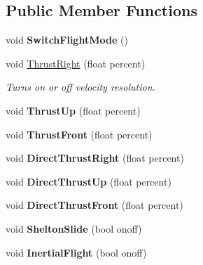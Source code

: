\subsection*{Public Member Functions}
\begin{DoxyCompactItemize}
\item 
void {\bfseries Switch\+Flight\+Mode} ()\hypertarget{classFlyByWire_af9250cf7eafb904f21574990d5c18bbb}{}\label{classFlyByWire_af9250cf7eafb904f21574990d5c18bbb}

\item 
void \hyperlink{classFlyByWire_a2eb3522f0b4c44f01d60c26e58e99970}{Thrust\+Right} (float percent)\hypertarget{classFlyByWire_a2eb3522f0b4c44f01d60c26e58e99970}{}\label{classFlyByWire_a2eb3522f0b4c44f01d60c26e58e99970}

\begin{DoxyCompactList}\small\item\em Turns on or off velocity resolution. \end{DoxyCompactList}\item 
void {\bfseries Thrust\+Up} (float percent)\hypertarget{classFlyByWire_a7f42f95122ce1140fff6c35977e398b4}{}\label{classFlyByWire_a7f42f95122ce1140fff6c35977e398b4}

\item 
void {\bfseries Thrust\+Front} (float percent)\hypertarget{classFlyByWire_a0964410d899a57570177986f729035b6}{}\label{classFlyByWire_a0964410d899a57570177986f729035b6}

\item 
void {\bfseries Direct\+Thrust\+Right} (float percent)\hypertarget{classFlyByWire_acc553e7ce408bf5ca1d333d232f8830f}{}\label{classFlyByWire_acc553e7ce408bf5ca1d333d232f8830f}

\item 
void {\bfseries Direct\+Thrust\+Up} (float percent)\hypertarget{classFlyByWire_af7155f932bb00a0967edaf8cd2d5f709}{}\label{classFlyByWire_af7155f932bb00a0967edaf8cd2d5f709}

\item 
void {\bfseries Direct\+Thrust\+Front} (float percent)\hypertarget{classFlyByWire_a80d37467a1489e74fe30764c2f5d4079}{}\label{classFlyByWire_a80d37467a1489e74fe30764c2f5d4079}

\item 
void {\bfseries Shelton\+Slide} (bool onoff)\hypertarget{classFlyByWire_a4534776da46c3f1cdb186e4a1c53a370}{}\label{classFlyByWire_a4534776da46c3f1cdb186e4a1c53a370}

\item 
void {\bfseries Inertial\+Flight} (bool onoff)\hypertarget{classFlyByWire_a978a1fbd8062b6b9712b5a145aedacac}{}\label{classFlyByWire_a978a1fbd8062b6b9712b5a145aedacac}


\end{DoxyCompactItemize}
